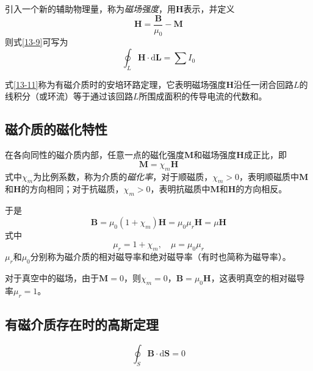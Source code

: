 \documentclass[
	12pt, %
	a4paper, %
]{myLegrandOrangeBook}
\newcommand{\rmd}{\mathrm{d}}
\begin{document}
引入一个新的辅助物理量，称为\emph{磁场强度}，用\(\boldsymbol{H}\)表示，并定义
\begin{equation}
    \boldsymbol{H} = \frac{\boldsymbol{B}}{\mu_0} - \boldsymbol{M}
\end{equation}
则式\ref{13-9}可写为
\begin{equation}
    \oint_L \boldsymbol{H} \cdot \rmd \boldsymbol{L} = \sum I_0
    \label{13-11}
\end{equation}

式\ref{13-11}称为有磁介质时的安培环路定理，它表明磁场强度\(\boldsymbol{H}\)沿任一闭合回路\(L\)的线积分（或环流）等于通过该回路\(L\)所围成面积的传导电流的代数和。

\subsection{磁介质的磁化特性}

在各向同性的磁介质内部，任意一点的磁化强度\(\boldsymbol{M}\)和磁场强度\(\boldsymbol{H}\)成正比，即
\begin{equation}
    \boldsymbol{M} = \chi_m \boldsymbol{H}
\end{equation}
式中\(\chi_m\)为比例系数，称为介质的\emph{磁化率}，对于顺磁质，\(\chi_m > 0\)，表明顺磁质中\(\boldsymbol{M}\)和\(\boldsymbol{H}\)的方向相同；对于抗磁质，\(\chi_m > 0\)，表明抗磁质中\(\boldsymbol{M}\)和\(\boldsymbol{H}\)的方向相反。

于是
\begin{equation}
    \boldsymbol{B} = \mu_0 (1 + \chi_m)\boldsymbol{H} = \mu_0 \mu_r \boldsymbol{H}= \mu \boldsymbol{H}
\end{equation}
式中
\begin{equation}
    \mu_r = 1 + \chi_m, \quad \mu = \mu_0\mu_r
\end{equation}
\(\mu_r\)和\(\mu_0\)分别称为磁介质的相对磁导率和绝对磁导率（有时也简称为磁导率）。

对于真空中的磁场，由于\(\boldsymbol{M} = 0\)，则\(\chi_m = 0\)，\(\boldsymbol{B} = \mu_0 \boldsymbol{H}\)，这表明真空的相对磁导率\(\mu_r = 1\)。

\subsection{有磁介质存在时的高斯定理}

\begin{equation}
    \oint_S \boldsymbol{B} \cdot \rmd \boldsymbol{S} = 0
\end{equation}



\end{document}
